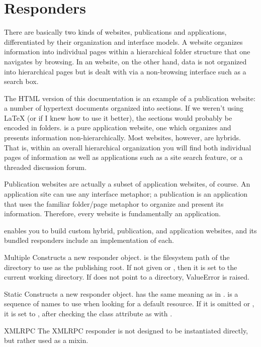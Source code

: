 \section{Responders \label{responders}}

There are basically two kinds of websites, publications and applications,
differentiated by their organization and interface models. A 
website organizes information into individual pages within a hierarchical folder
structure that one navigates by browsing. In an  website, on
the other hand, data is not organized into hierarchical pages but is dealt with
via a non-browsing interface such as a search box.

The HTML version of this documentation is an example of a publication website: a
number of hypertext documents organized into sections. If we weren't using LaTeX
(or if I knew how to use it better), the sections would probably be encoded in
folders.  is a pure application
website, one which organizes and presents information non-hierarchically. Most
websites, however, are hybrids. That is, within an overall hierarchical
organization you will find both individual pages of information as well as
applications such as a site search feature, or a threaded discussion forum.

Publication websites are actually a subset of application websites, of course.
An application site can use any interface metaphor; a publication is an
application that uses the familiar folder/page metaphor to organize and present
its information. Therefore, every website is fundamentally an application.

 enables you to build custom hybrid, publication, and application
websites, and its bundled responders include an implementation of each.



\begin{classdesc}{Multiple}{} Constructs a new 
responder object.  is the filesystem path of the directory to use as
the publishing root. If not given or , then it is set to the current
working directory. If  does not point to a directory, \exception
{ValueError} is raised.\end{classdesc}

\begin{classdesc}{Static}{} Constructs a new
 responder object.  has the same meaning as in
.  is a sequence of names to use when looking for
a default resource. If it is omitted or , it is set to
, after checking the class attribute as with
. \end{classdesc}

\begin{classdesc*}{XMLRPC}
The XMLRPC responder is not designed to be instantiated directly, but rather
used as a mixin.
\end{classdesc*}






